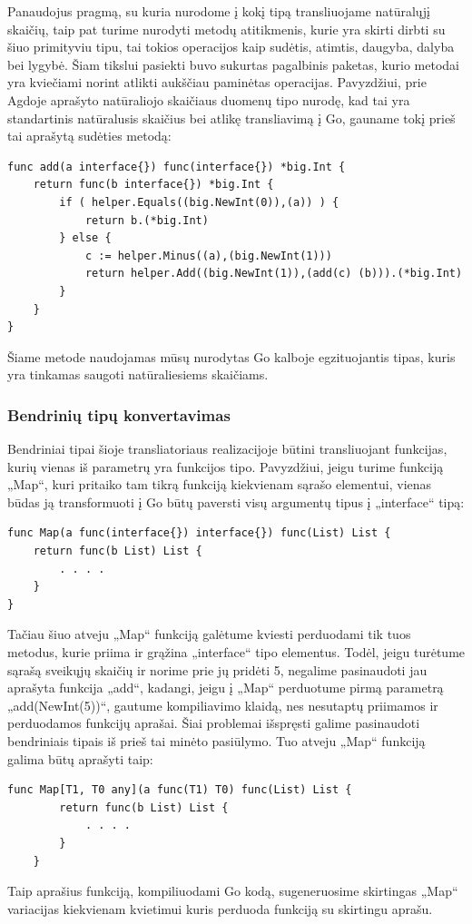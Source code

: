 \documentclass{VUMIFPSbakalaurinis}
\begin{document}
\par Panaudojus pragmą, su kuria nurodome į kokį tipą transliuojame natūralųjį skaičių, taip pat turime nurodyti metodų atitikmenis, kurie yra skirti dirbti su šiuo primityviu tipu, tai tokios operacijos kaip sudėtis, atimtis, daugyba, dalyba bei lygybė. Šiam tikslui pasiekti buvo sukurtas pagalbinis paketas, kurio metodai yra kviečiami norint atlikti aukščiau paminėtas operacijas. Pavyzdžiui, prie Agdoje aprašyto natūraliojo skaičiaus duomenų tipo nurodę, kad tai yra standartinis natūralusis skaičius bei atlikę transliavimą į Go, gauname tokį prieš tai aprašytą sudėties metodą:
\begin{lstlisting}[language=GoCust]
func add(a interface{}) func(interface{}) *big.Int {
	return func(b interface{}) *big.Int {
 		if ( helper.Equals((big.NewInt(0)),(a)) ) {
 			return b.(*big.Int) 
		} else {
 			c := helper.Minus((a),(big.NewInt(1))) 
 			return helper.Add((big.NewInt(1)),(add(c) (b))).(*big.Int) 
		}
 	}
}
\end{lstlisting}
Šiame metode naudojamas mūsų nurodytas Go kalboje egzituojantis tipas, kuris yra tinkamas saugoti natūraliesiems skaičiams.
\subsubsection{Bendrinių tipų konvertavimas}
Bendriniai tipai šioje transliatoriaus realizacijoje būtini transliuojant funkcijas, kurių vienas iš parametrų yra funkcijos tipo. Pavyzdžiui, jeigu turime funkciją „Map“, kuri pritaiko tam tikrą funkciją kiekvienam sąrašo elementui, vienas būdas ją transformuoti į Go būtų paversti visų argumentų tipus į „interface{}“ tipą:
\begin{lstlisting}[language=GoCust]
func Map(a func(interface{}) interface{}) func(List) List {
	return func(b List) List {
		. . . .
	}
}
\end{lstlisting}
Tačiau šiuo atveju „Map“ funkciją galėtume kviesti perduodami tik tuos metodus, kurie priima ir grąžina „interface{}“ tipo elementus. Todėl, jeigu turėtume sąrašą sveikųjų skaičių ir norime prie jų pridėti 5, negalime pasinaudoti jau aprašyta funkcija „add“, kadangi, jeigu į „Map“ perduotume pirmą parametrą „add(NewInt(5))“, gautume kompiliavimo klaidą, nes nesutaptų priimamos ir perduodamos funkcijų aprašai. Šiai problemai išspręsti galime pasinaudoti bendriniais tipais iš prieš tai minėto pasiūlymo. Tuo atveju „Map“ funkciją galima būtų aprašyti taip:
\begin{lstlisting}[language=GoCust]
	func Map[T1, T0 any](a func(T1) T0) func(List) List {
		return func(b List) List {
			. . . .
		}
	}
	\end{lstlisting}
Taip aprašius funkciją, kompiliuodami Go kodą, sugeneruosime skirtingas „Map“ variacijas kiekvienam kvietimui kuris perduoda funkciją su skirtingu aprašu.
\end{document}
